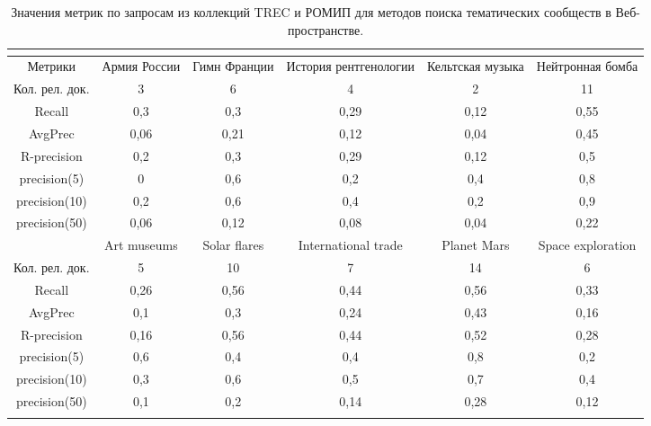 \begin{table}[ht]%
	\centering
	\caption{Значения метрик по запросам из коллекций TREC и РОМИП для методов поиска тематических сообществ в Веб-пространстве.}%
	\label{tab:metricsROMIPTREC}%
	\begin{adjustbox}{width=0.9\textwidth}
	\small
	\begin{tabular}{| c | c | c | c | c | c |}%
		\hline
		\\
		\hline
		Метрики & Армия России & Гимн Франции & История рентгенологии &  Кельтская музыка &  Нейтронная бомба \\
		\hline
		Кол. рел. док. & 3 & 6 & 4 & 2 & 11  \\
		\hline
		Recall & 0,3 & 0,3 & 0,29 & 0,12 & 0,55 \\
		\hline
		AvgPrec & 0,06 & 0,21 & 0,12 & 0,04 & 0,45  \\
		\hline
		R-precision & 0,2 & 0,3 & 0,29 & 0,12 & 0,5  \\
		\hline
		precision(5) & 0 & 0,6 & 0,2 & 0,4 & 0,8  \\
		\hline
		precision(10) & 0,2 & 0,6 & 0,4 & 0,2 & 0,9  \\
		\hline
		precision(50) & 0,06 & 0,12 & 0,08 & 0,04 & 0,22  \\
		\hline
		& Art museums & Solar flares & International trade &  Planet Mars &  Space exploration \\
		\hline
		Кол. рел. док. & 5 & 10 & 7 & 14 & 6  \\
		\hline
		Recall & 0,26 & 0,56 & 0,44 & 0,56 & 0,33 \\
		\hline
		AvgPrec & 0,1 & 0,3 & 0,24 & 0,43 & 0,16  \\
		\hline
		R-precision & 0,16 & 0,56 & 0,44 & 0,52 & 0,28  \\
		\hline
		precision(5) & 0,6 & 0,4 & 0,4 & 0,8 & 0,2  \\
		\hline
		precision(10) & 0,3 & 0,6 & 0,5 & 0,7 & 0,4  \\
		\hline
		precision(50) & 0,1 & 0,2 & 0,14 & 0,28 & 0,12  \\
		\hline
		\\

\end{tabular}
\end{adjustbox}
\end{table}
